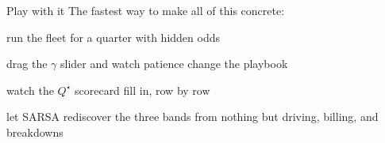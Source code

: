\begin{frame}{Play with it}
The fastest way to make all of this concrete:
\begin{center}
{\large \vizurl}
\end{center}
\vspace{2mm}
\begin{bullets}
\item run the fleet for a quarter with hidden odds
\item drag the $\gamma$ slider and watch patience change the playbook
\item watch the $Q^\star$ scorecard fill in, row by row
\item let SARSA rediscover the three bands from nothing but driving, billing, and breakdowns
\end{bullets}
\vspace{2mm}
\pause
\begin{center}
\end{center}
\end{frame}
